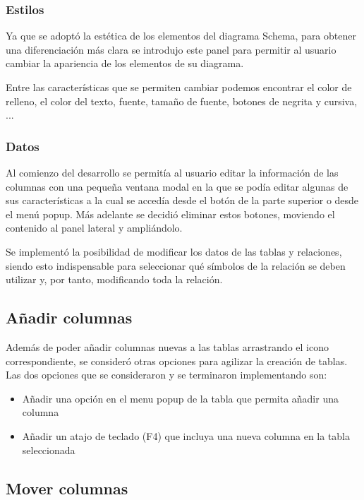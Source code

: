 
\subsubsection{Estilos}

Ya que se adoptó la estética de los elementos del diagrama Schema, para obtener una diferenciación más clara se introdujo este panel para permitir al usuario cambiar la apariencia de los elementos de su diagrama.

Entre las características que se permiten cambiar podemos encontrar el color de relleno, el color del texto, fuente, tamaño de fuente, botones de negrita y cursiva, ...

\subsubsection{Datos}

Al comienzo del desarrollo se permitía al usuario editar la información de las columnas con una pequeña ventana modal en la que se podía editar algunas de sus características a la cual se accedía desde el botón de la parte superior o desde el menú popup. Más adelante se decidió eliminar estos botones, moviendo el contenido al panel lateral y ampliándolo.

Se implementó la posibilidad de modificar los datos de las tablas y relaciones, siendo esto indispensable para seleccionar qué símbolos de la relación se deben utilizar y, por tanto, modificando toda la relación.

\subsection{Añadir columnas}

Además de poder añadir columnas nuevas a las tablas arrastrando el icono correspondiente, se consideró otras opciones para agilizar la creación de tablas. Las dos opciones que se consideraron y se terminaron implementando son:
\begin{itemize}
    \item Añadir una opción en el menu popup de la tabla que permita añadir una columna
    \item Añadir un atajo de teclado (F4) que incluya una nueva columna en la tabla seleccionada
\end{itemize}

\subsection{Mover columnas}

